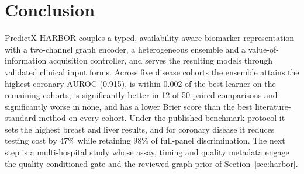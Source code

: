 \section{Conclusion}
PredictX-HARBOR couples a typed, availability-aware biomarker representation with a two-channel graph encoder, a heterogeneous ensemble and a value-of-information acquisition controller, and serves the resulting models through validated clinical input forms. Across five disease cohorts the ensemble attains the highest coronary AUROC (0.915), is within 0.002 of the best learner on the remaining cohorts, is significantly better in 12 of 50 paired comparisons and significantly worse in none, and has a lower Brier score than the best literature-standard method on every cohort. Under the published benchmark protocol it sets the highest breast and liver results, and for coronary disease it reduces testing cost by 47\% while retaining 98\% of full-panel discrimination. The next step is a multi-hospital study whose assay, timing and quality metadata engage the quality-conditioned gate and the reviewed graph prior of Section~\ref{sec:harbor}.
